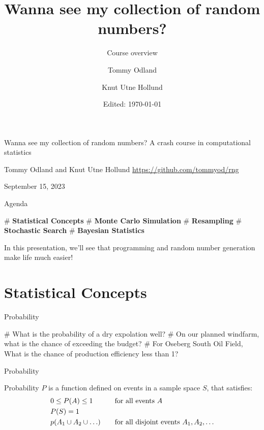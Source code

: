 \documentclass[12pt, aspectratio=149]{beamer}
\institute{Equinor}
\date{Edited: \today}
\author{Tommy Odland \and Knut Utne Hollund}
\title{Wanna see my collection of random numbers?}
\subtitle{Course overview}
\theoremstyle{plain}
\begin{document}
\begin{frame}{}
	\begin{center}
			\vfill
	{\huge Wanna see my collection of random numbers?}
	\vfill
	{\large A crash course in computational statistics}
	\vfill
	

	\vfill
	{\large  Tommy Odland and Knut Utne Hollund}
	\vfill
	{\small \href{https://github.com/tommyod/rng}{https://github.com/tommyod/rng}}

	\vfill
	September 15, 2023
	\vfill
	\end{center}
\end{frame}

\begin{frame}[fragile]{Agenda}
	\begin{center}
	\end{center}
	
	\begin{easylist}[itemize]
		# \textbf{Statistical Concepts} 
		# \textbf{Monte Carlo Simulation}
		# \textbf{Resampling}
		# \textbf{Stochastic Search} 
		# \textbf{Bayesian Statistics} 
	\end{easylist}
	\hspace{4em}

	In this presentation, we'll see that programming and random number generation make life much easier!
\end{frame}


\section{Statistical Concepts}

\begin{frame}[fragile]{Probability}
	
	\begin{easylist}[itemize]
		# What is the probability of a dry expolation well?
		# On our planned windfarm, what is the chance of exceeding the budget?
		# For Oseberg South Oil Field, What is the chance of production efficiency less than 1?
	\end{easylist}
\end{frame}

\begin{frame}[fragile]{Probability}

	Probability $P$ is a function defined on events in a sample space $S$, that satisfies:
	\begin{align*}
		& 0 \leq P(A) \leq 1  & & \text{for all events $A$} \\
		& P(S) = 1 & & \\
		& p(A_{1} \cup A_{2} \cup \ldots) & \hspace*{1em} & \text{for all disjoint events $A_{1}, A_{2}, \ldots$}	
	\end{align*}  
	
\end{frame}
\end{document}
